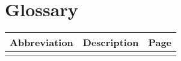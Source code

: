 

\chapter[Glossary]{Glossary}

\begin{center}
\small
\begin{longtable}{lp{3.0in}c}
\toprule \multicolumn{1}{c}{Abbreviation}
                & \multicolumn{1}{c}{Description}
                                & \multicolumn{1}{c}{Page}\\ \midrule\addlinespace[2pt] \endhead

\bottomrule\endfoot



\end{longtable}

\end{center}

